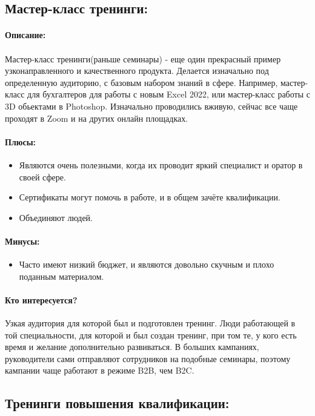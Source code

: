 \documentclass{article}
\begin{document}
\subsection{Мастер-класс тренинги:}
\paragraph{\textbf{Описание:}}
\paragraph{}
Мастер-класс тренинги(раньше семинары) - еще один прекрасный пример узконаправленного и качественного продукта. Делается изначально под определенную аудиторию, с базовым набором знаний в сфере. Например, мастер-класс для бухгалтеров для работы с новым Excel 2022, или мастер-класс работы с 3D обьектами в Photoshop. Изначально проводились вживую, сейчас все чаще проходят в Zoom и на других онлайн площадках. 
\paragraph{\textbf{Плюсы:}}
\begin{itemize}
    \item Являются очень полезными, когда их проводит яркий специалист и оратор в своей сфере.
    \item Сертификаты могут помочь в работе, и в общем зачёте квалификации.
    \item Объединяют людей.
\end{itemize}
\paragraph{\textbf{Минусы:}}
\begin{itemize}
    \item Часто имеют низкий бюджет, и являются довольно скучным и плохо поданным материалом.
\end{itemize}
\paragraph{\textbf{Кто интересуется?}}
Узкая аудитория для которой был и подготовлен тренинг. Люди работающей в той специальности, для которой и был создан тренинг, при том те, у кого есть время и желание дополнительно развиваться. В больших кампаниях, руководители сами отправляют сотрудников на подобные семинары, поэтому кампании чаще работают в режиме B2B, чем B2C.


\subsection{Тренинги повышения квалификации:}
\end{document}
